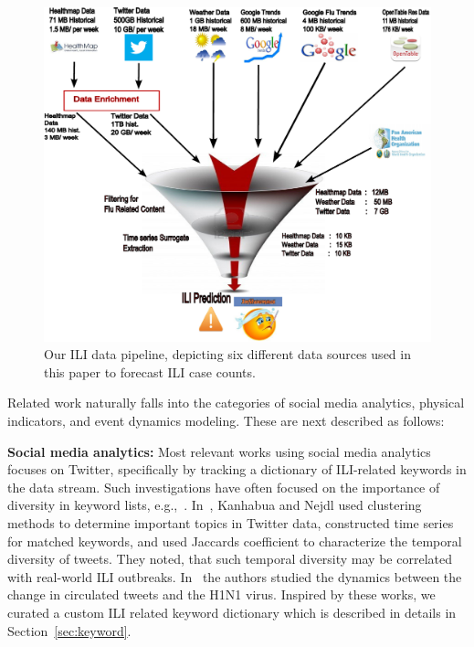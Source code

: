 
\begin{figure}[t] \centering
  \captionsetup{font=scriptsize}
    \includegraphics[width=0.95\columnwidth]{fig/ili_data_pipeline.pdf}
    \caption{\label{fig:ili_data_pipeline} Our ILI data pipeline, depicting 
six different data sources used in this paper to forecast ILI case counts.}
\vspace{-2em}
 \end{figure}

Related work naturally falls into the categories of social media
analytics, physical indicators, and event dynamics modeling.  These are
next described as follows:
 
\textbf{Social media analytics:}
Most relevant works using social media analytics focuses on Twitter,
specifically  by tracking
a dictionary of ILI-related keywords in the data stream.
Such investigations have often focused on the importance of diversity in keyword 
lists, e.g.,~\cite{ref5, ref6}. In~\cite{ref5}, 
Kanhabua and Nejdl used clustering methods to determine
important topics in Twitter data, constructed time series for matched keywords,
and used Jaccards coefficient to characterize the temporal
diversity of tweets. They noted, that such temporal diversity may be
correlated with real-world ILI outbreaks. In~\cite{ref6}
the authors studied the dynamics between the change in circulated tweets
and the H1N1 virus. Inspired by these works, we curated a custom ILI
related keyword dictionary which is described in details in Section~\ref{sec:keyword}.

